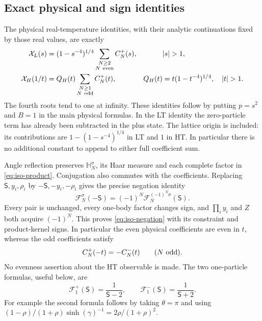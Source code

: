 \documentclass[11pt]{article}
\numberwithin{equation}{section}
\theoremstyle{definition}
\begin{document}
\subsection{Exact physical and sign identities}

The physical real-temperature identities, with their analytic
continuations fixed by those real values, are exactly
\begin{align}
 \mathcal X_L(s)
   &=(1-s^{-4})^{1/4}
       \sum_{\substack{N\ge2\\N\ {\rm even}}}C_N^+(s),
       &&|s|>1,\label{eq:iso-physical-L}\\
 \mathcal X_H(1/t)
   &=Q_H(t)\sum_{\substack{N\ge1\\N\ {\rm odd}}}C_N^+(t),
       &Q_H(t)&=t(1-t^{-4})^{1/4},\quad |t|>1.
       \label{eq:iso-physical-H}
\end{align}
The fourth roots tend to one at infinity.  These identities follow by
putting $p=s^2$ and $B=1$ in the main physical formulas.  In the LT
identity the zero-particle term has already been subtracted in the plus
state.  The lattice origin is included: its contributions are
$1-(1-s^{-4})^{1/4}$ in LT and $1$ in HT.  In particular there is no
additional constant to append to either full coefficient sum.

Angle reflection preserves $\mathbb H_N^\sigma$, its Haar measure and
each complete factor in \eqref{eq:iso-product}.  Conjugation also
commutes with the coefficients.  Replacing $\mathsf S,y_i,\rho_i$ by
$-\mathsf S,-y_i,-\rho_i$ gives the precise negation identity
\begin{equation}\label{eq:iso-negation}
 \mathcal F_N^\sigma(-\mathsf S)
   =(-1)^N\mathcal F_N^{(-1)^N\sigma}(\mathsf S).
\end{equation}
Every pair is unchanged, every one-body factor changes sign, and
$\prod_i y_i$ and $Z$ both acquire $(-1)^N$.  This proves
\eqref{eq:iso-negation} with its constraint and product-kernel signs.
In particular the even physical coefficients are even in $t$, whereas
the odd coefficients satisfy
\begin{equation}\label{eq:iso-odd-negation}
 C_N^+(-t)=-C_N^-(t)\qquad(N\ {\rm odd}).
\end{equation}
No evenness assertion about the HT observable is made.
The two one-particle formulas, useful below, are
\begin{equation}\label{eq:iso-one-particle}
 \mathcal F_1^+(\mathsf S)=\frac1{\mathsf S-2},\qquad
 \mathcal F_1^-(\mathsf S)=\frac1{\mathsf S+2}.
\end{equation}
For example the second formula follows by taking $\theta=\pi$ and
using $(1-\rho)/(1+\rho)\sinh(\gamma)^{-1}
=2\rho/(1+\rho)^2$.
\end{document}
